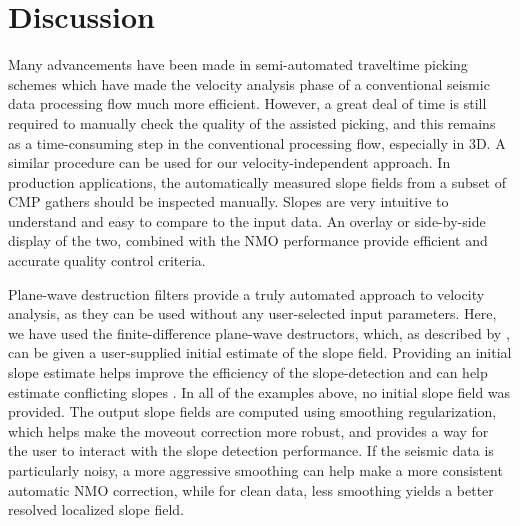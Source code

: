 \section{Discussion}
Many advancements have been made in semi-automated traveltime picking schemes which have made the velocity analysis phase of a conventional seismic data processing flow much more efficient.  However, a great deal of time is still required to manually check the quality of the assisted picking, and this remains as a time-consuming step in the conventional processing flow, especially in 3D.  A similar procedure can be used for our velocity-independent approach.  In production applications, the automatically measured slope fields from a subset of CMP gathers should be inspected manually.  Slopes are very intuitive to understand and easy to compare to the input data.  An overlay or side-by-side display of the two, combined with the NMO performance provide efficient and accurate quality control criteria.

Plane-wave destruction filters provide a truly automated approach to velocity analysis, as they can be used without any user-selected input parameters.  Here, we have used the finite-difference plane-wave destructors, which, as described by \cite{GEO67-06-19461960}, can be given a user-supplied initial estimate of the slope field.  Providing an initial slope estimate helps improve the efficiency of the slope-detection and can help estimate conflicting slopes \cite[]{GEO67-06-19461960}.  In all of the examples above, no initial slope field was provided.  The output slope fields are computed using smoothing regularization, which helps make the moveout correction more robust, and provides a way for the user to interact with the slope detection performance. If the seismic data is particularly noisy, a more aggressive smoothing can help make a more consistent automatic NMO correction, while for clean data, less smoothing yields a better resolved localized slope field.

